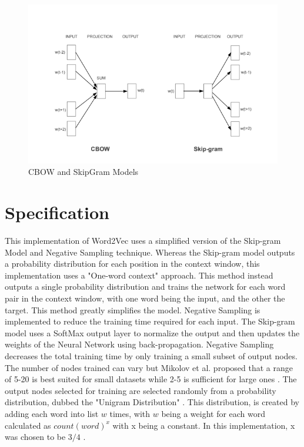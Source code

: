\documentclass{article}
\begin{document}
\begin{figure}
	\includegraphics[width=\linewidth]{models.png}
	\caption{CBOW and SkipGram Models}
	\label{fig:models}
\end{figure}	

\section{Specification}

This implementation of Word2Vec uses a simplified version of the Skip-gram Model and Negative Sampling technique. Whereas the Skip-gram model outputs a probability distribution for each position in the context window, this implementation uses a "One-word context" \cite{parameter} approach. This method instead outputs a single probability distribution and trains the network for each word pair in the context window, with one word being the input, and the other the target. This method greatly simplifies the model. Negative Sampling is implemented to reduce the training time required for each input. The Skip-gram model uses a SoftMax output layer to normalize the output and then updates the weights of the Neural Network using back-propagation. Negative Sampling decreases the total training time by only training a small subset of output nodes. The number of nodes trained can vary but Mikolov et al. proposed that a range of 5-20 is best suited for small datasets while 2-5 is sufficient for large ones \cite{distributed}. The output nodes selected for training are selected randomly from a probability distribution, dubbed the "Unigram Distribution" \cite{distributed}. This distribution,  is created by adding each word into list $w$ times, with $w$ being a weight for each word calculated as $count(word)^x$ with x being a constant. In this implementation, x was chosen to be $3/4$ \cite{explained}. 
\end{document}
